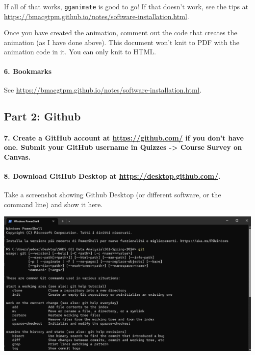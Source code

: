 \documentclass[
]{article}
\begin{document}
If all of that works, \texttt{gganimate} is good to go! If that doesn't
work, see the tips at
\url{https://bmacgtpm.github.io/notes/software-installation.html}.

Once you have created the animation, comment out the code that creates
the animation (as I have done above). This document won't knit to PDF
with the animation code in it. You can only knit to HTML.

\hypertarget{bookmarks}{%
\paragraph{6. Bookmarks}\label{bookmarks}}

See \url{https://bmacgtpm.github.io/notes/software-installation.html}.

\hypertarget{part-2-github}{%
\subsection{Part 2: Github}\label{part-2-github}}

\hypertarget{create-a-github-account-at-httpsgithub.com-if-you-dont-have-one.-submit-your-github-username-in-quizzes---course-survey-on-canvas.}{%
\paragraph{\texorpdfstring{7. Create a GitHub account at
\url{https://github.com/} if you don't have one. Submit your GitHub
username in Quizzes -\textgreater{} Course Survey on
Canvas.}{7. Create a GitHub account at https://github.com/ if you don't have one. Submit your GitHub username in Quizzes -\textgreater{} Course Survey on Canvas.}}\label{create-a-github-account-at-httpsgithub.com-if-you-dont-have-one.-submit-your-github-username-in-quizzes---course-survey-on-canvas.}}

\hypertarget{download-github-desktop-at-httpsdesktop.github.com.}{%
\paragraph{\texorpdfstring{8. Download GitHub Desktop at
\url{https://desktop.github.com/}.}{8. Download GitHub Desktop at https://desktop.github.com/.}}\label{download-github-desktop-at-httpsdesktop.github.com.}}

Take a screenshot showing Github Desktop (or different software, or the
command line) and show it here.

\includegraphics{img/command_line.png}
\end{document}
